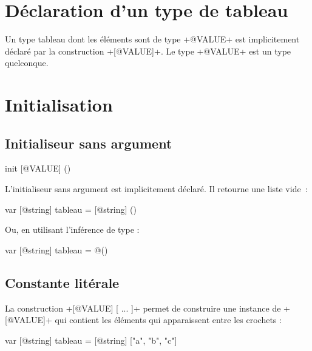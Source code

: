 



\section{Déclaration d'un type de tableau}

Un type tableau dont les éléments sont de type \ggsq+@VALUE+ est implicitement déclaré par la construction \ggsq+[@VALUE]+. Le type \ggsq+@VALUE+ est un type quelconque.

\section{Initialisation}

\subsection{Initialiseur sans argument}

\begin{galgas4box}
init [@VALUE] ()
\end{galgas4box}

L'initialiseur sans argument est implicitement déclaré. Il retourne une liste vide~:

\begin{galgas4}
var [@string] tableau = [@string] ()
\end{galgas4}

Ou, en utilisant l'inférence de type :
\begin{galgas4}
var [@string] tableau = @()
\end{galgas4}


\subsection{Constante litérale}

La construction \ggsq+[@VALUE] [ ... ]+ permet de construire une instance de \ggsq+[@VALUE]+ qui contient les éléments qui apparaissent entre les crochets :

\begin{galgas4}
var [@string] tableau = [@string] ["a", "b", "c"]
\end{galgas4}


